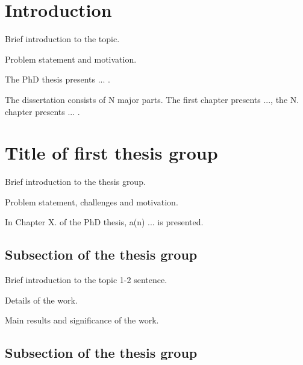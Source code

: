 \documentclass[12pt,a4paper]{extarticle}
\begin{document}
\nobibliography*


 
\newpage
\thispagestyle{empty}
\mbox{}

\newpage

\setcounter{page}{1}
 
\newpage
\section{Introduction}

Brief introduction to the topic. 

Problem statement and motivation.

The PhD thesis presents ... .

The dissertation consists of N major parts. The first chapter presents ..., the N. chapter presents ... .

\section{Title of first thesis group}

Brief introduction to the thesis group.

Problem statement, challenges and motivation.

In Chapter X. of the PhD thesis, a(n) ... is presented.

\subsection{Subsection of the thesis group}


Brief introduction to the topic 1-2 sentence.

Details of the work.

Main results and significance of the work.

\subsection{Subsection of the thesis group}
\end{document}
